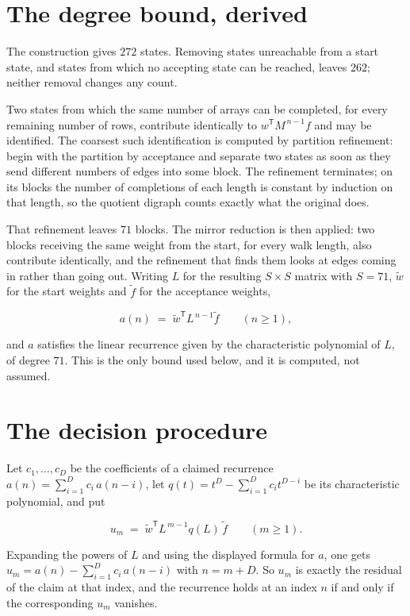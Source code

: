 \documentclass[11pt]{article}
\theoremstyle{definition}
\begin{document}
\section{The degree bound, derived}

The construction gives $272$ states. Removing states unreachable from a start state, and states from which no accepting state can be reached, leaves $262$; neither removal changes any count.

Two states from which the same number of arrays can be completed, for every remaining number of rows, contribute identically to $w^{\mathsf T}M^{\,n-1}f$ and may be identified. The coarsest such identification is computed by partition refinement: begin with the partition by acceptance and separate two states as soon as they send different numbers of edges into some block. The refinement terminates; on its blocks the number of completions of each length is constant by induction on that length, so the quotient digraph counts exactly what the original does.

That refinement leaves $71$ blocks. The mirror reduction is then applied: two blocks receiving the same weight from the start, for every walk length, also contribute identically, and the refinement that finds them looks at edges coming in rather than going out. Writing $L$ for the resulting $S \times S$ matrix with $S = 71$, $\tilde w$ for the start weights and $\tilde f$ for the acceptance weights,

\[a(n) \;=\; \tilde w^{\mathsf T} L^{\,n-1} \tilde f \qquad (n \ge 1),\]

and $a$ satisfies the linear recurrence given by the characteristic polynomial of $L$, of degree $71$. This is the only bound used below, and it is computed, not assumed.

\section{The decision procedure}

Let $c_1,\dots,c_D$ be the coefficients of a claimed recurrence $a(n) = \sum_{i=1}^{D} c_i\,a(n-i)$, let $q(t) = t^{D} - \sum_{i=1}^{D} c_i t^{D-i}$ be its characteristic polynomial, and put

\[u_m \;=\; \tilde w^{\mathsf T} L^{\,m-1} q(L)\,\tilde f \qquad (m \ge 1).\]

Expanding the powers of $L$ and using the displayed formula for $a$, one gets $u_m = a(n) - \sum_{i=1}^{D} c_i\,a(n-i)$ with $n = m + D$. So $u_m$ is exactly the residual of the claim at that index, and the recurrence holds at an index $n$ if and only if the corresponding $u_m$ vanishes.
\end{document}
